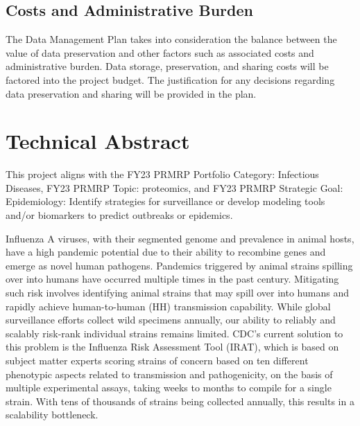 \documentclass[onecolumn, compsoc,12pt]{IEEEtran}
\begin{document}
\subsection{Costs and Administrative Burden}

The Data Management Plan takes into consideration the balance between the value of data preservation and other factors such as associated costs and administrative burden. Data storage, preservation, and sharing costs will be factored into the project budget. The justification for any decisions regarding data preservation and sharing will be provided in the plan.




\clearpage
{}

\section*{Technical Abstract}
This project aligns with the FY23 PRMRP Portfolio Category: Infectious Diseases, FY23 PRMRP Topic: proteomics, and FY23 PRMRP Strategic Goal: Epidemiology: Identify strategies for surveillance or develop modeling tools and/or biomarkers to predict outbreaks or epidemics.


Influenza A viruses, with their segmented genome and prevalence in animal hosts, have a high pandemic potential due to their ability to recombine genes and emerge as novel human pathogens. Pandemics triggered by animal strains spilling over into humans have occurred multiple times in the past century. Mitigating such risk involves identifying animal strains that may spill over into humans and rapidly achieve human-to-human (HH) transmission capability. While global surveillance efforts collect wild specimens annually, our ability to reliably and scalably risk-rank individual strains remains limited.
CDC's current solution to this problem is the Influenza Risk Assessment Tool (IRAT), which is based on subject matter experts scoring  strains of concern based on ten different phenotypic aspects  related to transmission and  pathogenicity, on the basis of  multiple experimental assays,  taking  weeks to months to compile for a single strain. With tens of   thousands of strains being collected annually, this results in  a scalability bottleneck.
\end{document}
